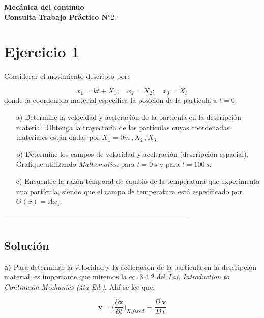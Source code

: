 \documentclass[10pt,a4paper]{article}
\theoremstyle{definition}
\begin{document}
\begin{center}
{\bf \large Mecánica del continuo \\ Consulta Trabajo Práctico N$^o 2:$ }
\end{center}

\medskip


\section*{Ejercicio 1}
Considerar el movimiento descripto por:


\begin{equation}\label{e1}
x_1 = kt+X_1 ; \quad x_2 = X_2 ;\quad x_3 = X_3
\end{equation}
\noindent donde la coordenada material especifica la posici\'on de la part\'icula a $t=0$.

\begin{itemize}
\item[a)] Determine la velocidad y aceleraci\'on de la part\'icula en la descripción material. Obtenga la trayectoria de las partículas cuyas coordenadas materiales están dadas por $X_1 = 0 m\, , X_2 \, , X_3 $
\item[b)] Determine los campos de velocidad y aceleración (descripción espacial). Grafique utilizando \textit{Mathematica} para $t = 0 \, s$ y para $t = 100 \, s$. 
\item[c)] Encuentre la razón temporal de cambio de la temperatura que experimenta una partícula, siendo que el campo de temperatura está especificado por $\Theta(x)=A x_1$. 
\end{itemize}

\begin{center}------------------------------------------------------------------------------\end{center}

\subsection*{Solución}

\textbf{a)}
 Para determinar la velocidad y la aceleración de la partícula en la descripción material, es importante que miremos la ec. 3.4.2 del \textit{Lai, Introduction to Continuum Mechanics (4ta Ed.)}. Ahí se lee que:

\begin{equation} \label{evel}
\mathbf{v} = \Big( \frac{\partial \mathbf{x}}{\partial t} \Big)_{X_i fixed} \equiv \frac{D \, \mathbf{v}}{D \, t}
\end{equation}
\end{document}
